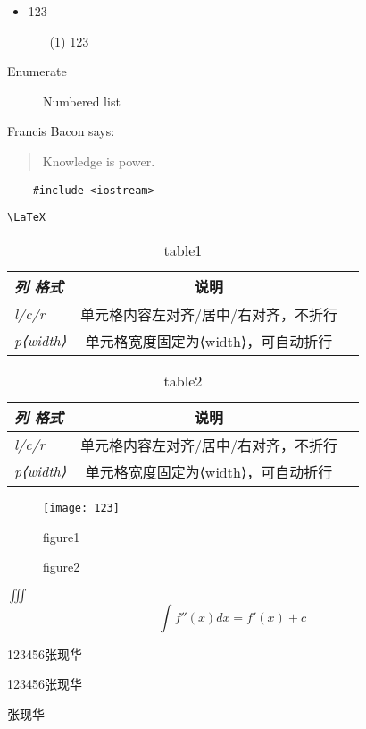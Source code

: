 		\begin{itemize}
			\item 123
			\begin{itemize}
				\item[(1)] 123
			\end{itemize}
		\end{itemize}
	\begin{description}
		\item[Enumerate] Numbered list
	\end{description}

Francis Bacon says:
\begin{quotation}
	Knowledge is power.
\end{quotation}
\begin{verbatim}
	#include <iostream>
\end{verbatim}
\verb|\LaTeX|

\begin{table}[htbp]
	\begin{tabular}{>{\itshape}l<{}|cc}
		\hline 
		列 格式      &    说明&\\
		\hline
		l/c/r       &   单元格内容左对齐/居中/右对齐，不折行&\\
		\cline{2-3}
		p{⟨width⟩}  &   单元格宽度固定为⟨width⟩，可自动折行&\\
		\hline
	\end{tabular}
	\caption{table1}\label{表格1}
\end{table}

\begin{table}[htbp]
	\begin{flushright}
		\begin{tabular}{>{\itshape}l<{}cc}
			\toprule
			列 格式      &    说明&\\
			\midrule
			l/c/r       &   单元格内容左对齐/居中/右对齐，不折行&\\
			p{⟨width⟩}  &   单元格宽度固定为⟨width⟩，可自动折行&\\
			\bottomrule
		\end{tabular}
		\caption{table2}
	\end{flushright}
\end{table}


\begin{figure}[htbp]
	\centering
		\texttt{[image: 123]}	
	\caption{figure1}
\end{figure}

\begin{figure}[htbp]
	\centering
	\subfloat[12321]{\texttt{[image: 123]}}	
	\subfloat[32123]{\texttt{[image: 123]}}	
	\caption{figure2}
\end{figure}

$ \iiint $
\begin{equation}
	\int f''(x) dx = f'(x) + c
\end{equation}

123456张现华\par
{}123456张现华\par
\kaishu 张现华
